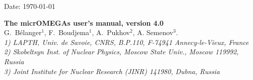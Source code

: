 \documentclass[12pt,a4paper]{article}
\begin{document}
\def\micro{{\tt micrOMEGAs}}
\def\ra{\rightarrow}
\def\calchep{{\tt CalcHEP}}

\def\suspect{{\tt SuSpect}}
\def\mbmb{m_b(m_b)}
\def\mt{m_t}
\def\dMb{\Delta m_b}
\def\dMq{\Delta m_q}
\def\delrho{\Delta\rho}
\def\bsgamma{b\to s\gamma}
\def\bsmu{B_s\to \mu^+\mu^-}
\def\gmuon{(g-2)_\mu}
\def\noi{\noindent}
\def\VERSION{4.0}


\begin{flushright}
   \vspace*{-18mm}
   Date: \today
\end{flushright}
\vspace*{2mm}




\begin{center}


{\Large\bf The  micrOMEGAs user's manual, version 4.0} \\[8mm]

{\large   G.~B\'elanger$^1$, F.~Boudjema$^1$, A.~Pukhov$^2$,  A. Semenov$^3$.}\\[4mm]

{\it 1) LAPTH, Univ. de Savoie, CNRS, B.P.110,  F-74941 Annecy-le-Vieux, France\\
     2) Skobeltsyn Inst. of Nuclear Physics, Moscow State Univ., Moscow 119992, Russia\\
     3) Joint Institute for Nuclear Research (JINR) 141980, Dubna,  Russia\\}
\end{center}

\begin{abstract}
We give an up-to-date description of the micrOMEGAs functions. Only the routines which are available for
the users are described.  Examples on how to use these functions
can be found in the sample main programs distributed with the code. 
\end{abstract}



\tableofcontents

\newpage
\end{document}
